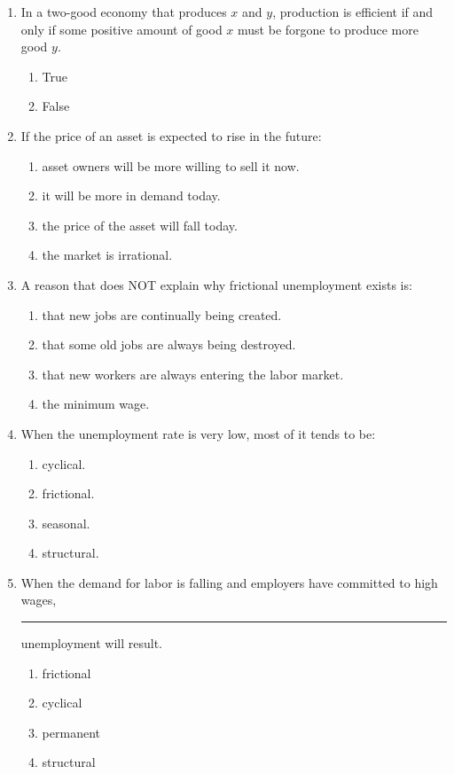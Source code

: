 \documentclass[
    letterpaper,paper=portrait,fleqn,
    DIV=16,fontsize=12pt,twoside=semi,
    parskip=full-,
    headings=standardclasses]
{scrartcl}
\begin{document}
\begin{enumerate}[resume]

\item In a two-good economy that produces $x$ and $y$, production is efficient if and only if some positive amount of good $x$ must be forgone to produce more good $y$.
\vspace{-8pt}
\begin{enumerate}
\item True
\item False
\end{enumerate}

\item If the price of an asset is expected to rise in the future:
\vspace{-8pt}
\begin{enumerate}
\item asset owners will be more willing to sell it now.
\item it will be more in demand today.
\item the price of the asset will fall today.
\item the market is irrational.
\end{enumerate}

\item A reason that does NOT explain why frictional unemployment exists is:
\vspace{-8pt}
\begin{enumerate}
\item that new jobs are continually being created.
\item that some old jobs are always being destroyed.
\item that new workers are always entering the labor market.
\item the minimum wage.
\end{enumerate}

\item When the unemployment rate is very low, most of it tends to be:
\vspace{-8pt}
\begin{enumerate}
\item cyclical.
\item frictional.
\item seasonal.
\item structural.
\end{enumerate}

\item When the demand for labor is falling and employers have committed to high wages, \rule{1cm}{0.15mm} unemployment will result.
\vspace{-8pt}
\begin{enumerate}
\item frictional
\item cyclical
\item permanent
\item structural
\end{enumerate}


\end{enumerate}
\end{document}
